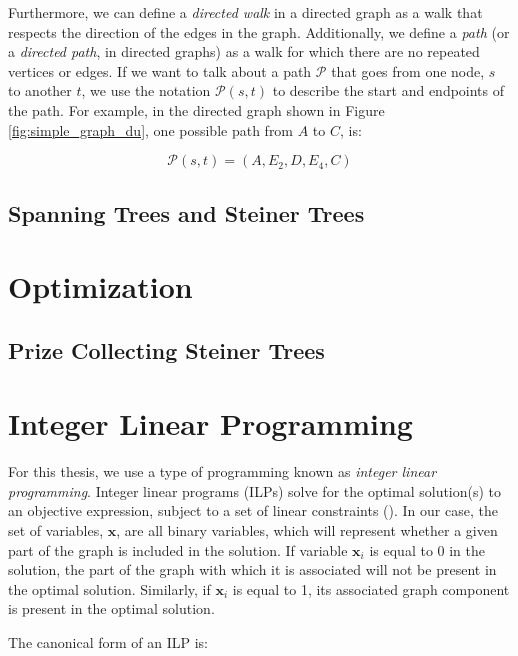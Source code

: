 \documentclass[12pt,twoside]{reedthesis}
\theoremstyle{definition}
\begin{document}
{   Furthermore, we can define a \textit{directed walk} in a directed graph as a walk that respects the direction of the edges in the graph. Additionally, we define a \textit{path} (or a \textit{directed path}, in directed graphs) as a walk for which there are no repeated vertices or edges. If we want to talk about a path $\mathcal{P}$ that goes from one node, $s$ to another $t$, we use the notation $\mathcal{P}(s,t)$ to describe the start and endpoints of the path. For example, in the directed graph shown in Figure \ref{fig:simple_graph_du}, one possible path from $A$ to $C$, is:

   \begin{equation*}
     \mathcal{P}(s,t) = (A,E_2,D,E_4,C)
   \end{equation*}

   \subsection{Spanning Trees and Steiner Trees}

 \section{Optimization}

  \subsection{Prize Collecting Steiner Trees}

 \section{Integer Linear Programming}

  For this thesis, we use a type of programming known as \textit{integer linear programming}. Integer linear programs (ILPs) solve for the optimal solution(s) to an objective expression, subject to a set of linear constraints (\cite{Papadimitriou1998}). In our case, the set of variables, $\mathbf{x}$, are all binary variables, which will represent whether a given part of the graph is included in the solution. If variable $\mathbf{x}_i$ is equal to 0 in the solution, the part of the graph with which it is associated will not be present in the optimal solution. Similarly, if $\mathbf{x}_i$ is equal to 1, its associated graph component is present in the optimal solution.\par

  The canonical form of an ILP is:


}
\end{document}
